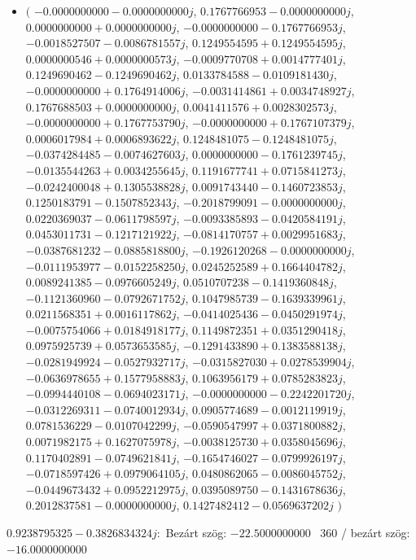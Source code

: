 \documentclass[14pt,a4paper]{article}
\begin{document}
\begin{itemize}
\item
$\big($
$-0.0000000000-0.0000000000j$, $0.1767766953-0.0000000000j$, $0.0000000000+0.0000000000j$, $-0.0000000000-0.1767766953j$, $-0.0018527507-0.0086781557j$, $0.1249554595+0.1249554595j$, $0.0000000546+0.0000000573j$, $-0.0009770708+0.0014777401j$, $0.1249690462-0.1249690462j$, $0.0133784588-0.0109181430j$, $-0.0000000000+0.1764914006j$, $-0.0031414861+0.0034748927j$, $0.1767688503+0.0000000000j$, $0.0041411576+0.0028302573j$, $-0.0000000000+0.1767753790j$, $-0.0000000000+0.1767107379j$, $0.0006017984+0.0006893622j$, $0.1248481075-0.1248481075j$, $-0.0374284485-0.0074627603j$, $0.0000000000-0.1761239745j$, $-0.0135544263+0.0034255645j$, $0.1191677741+0.0715841273j$, $-0.0242400048+0.1305538828j$, $0.0091743440-0.1460723853j$, $0.1250183791-0.1507852343j$, $-0.2018799091-0.0000000000j$, $0.0220369037-0.0611798597j$, $-0.0093385893-0.0420584191j$, $0.0453011731-0.1217121922j$, $-0.0814170757+0.0029951683j$, $-0.0387681232-0.0885818800j$, $-0.1926120268-0.0000000000j$, $-0.0111953977-0.0152258250j$, $0.0245252589+0.1664404782j$, $0.0089241385-0.0976605249j$, $0.0510707238-0.1419360848j$, $-0.1121360960-0.0792671752j$, $0.1047985739-0.1639339961j$, $0.0211568351+0.0016117862j$, $-0.0414025436-0.0450291974j$, $-0.0075754066+0.0184918177j$, $0.1149872351+0.0351290418j$, $0.0975925739+0.0573653585j$, $-0.1291433890+0.1383588138j$, $-0.0281949924-0.0527932717j$, $-0.0315827030+0.0278539904j$, $-0.0636978655+0.1577958883j$, $0.1063956179+0.0785283823j$, $-0.0994440108-0.0694023171j$, $-0.0000000000-0.2242201720j$, $-0.0312269311-0.0740012934j$, $0.0905774689-0.0012119919j$, $0.0781536229-0.0107042299j$, $-0.0590547997+0.0371800882j$, $0.0071982175+0.1627075978j$, $-0.0038125730+0.0358045696j$, $0.1170402891-0.0749621841j$, $-0.1654746027-0.0799926197j$, $-0.0718597426+0.0979064105j$, $0.0480862065-0.0086045752j$, $-0.0449673432+0.0952212975j$, $0.0395089750-0.1431678636j$, $0.2012837581-0.0000000000j$, $0.1427482412-0.0569637202j$
$\big)$
\end{itemize}
$0.9238795325-0.3826834324j$:\
Bezárt szög: $-22.5000000000$ \
360 / bezárt szög: $-16.0000000000$\
\end{document}
